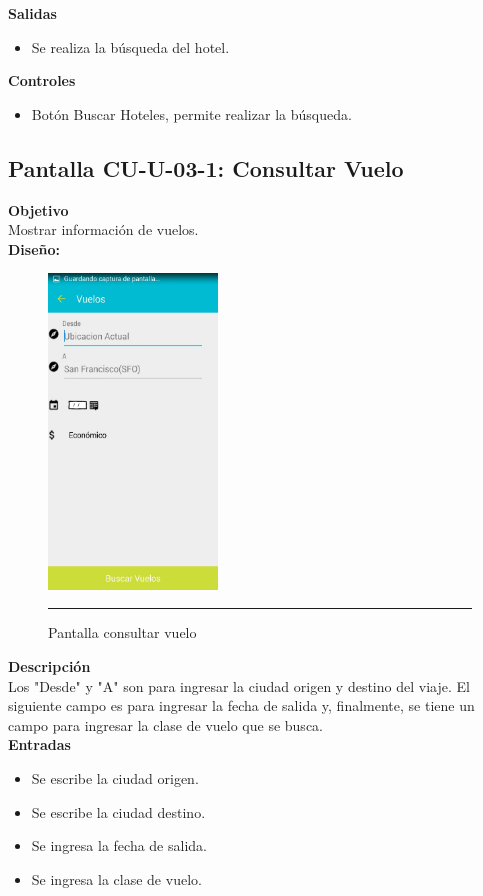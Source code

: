 \textbf{Salidas}
\begin{itemize}
\item Se realiza la búsqueda del hotel.
\end{itemize}

\textbf{Controles}
\begin{itemize}
\item Botón Buscar Hoteles, permite realizar la búsqueda.
\end{itemize}
\clearpage
\hypertarget{CU-U-03-1}{}
\subsection{Pantalla CU-U-03-1: Consultar Vuelo}
\textbf{Objetivo}\\
Mostrar información de vuelos. \\

\textbf{Diseño:}
\begin{figure}[h]
	\centering
		\includegraphics[width=0.4\textwidth]{Figuras/intConsultarVuelo.png}
		\rule{30em}{0.5pt}
	\caption[Pantalla consultar vuelo]{Pantalla consultar vuelo}
	\label{fig:intHoteles}
\end{figure}

\textbf{Descripción} \\
Los "Desde" y "A" son para ingresar la ciudad origen y destino del viaje. El siguiente campo es para ingresar la fecha de salida y, finalmente, se tiene un campo para ingresar la clase de vuelo que se busca. \\

\textbf{Entradas}
\begin{itemize}
\item Se escribe la ciudad origen.
\item Se escribe la ciudad destino.
\item Se ingresa la fecha de salida.
\item Se ingresa la clase de vuelo.
\end{itemize}

